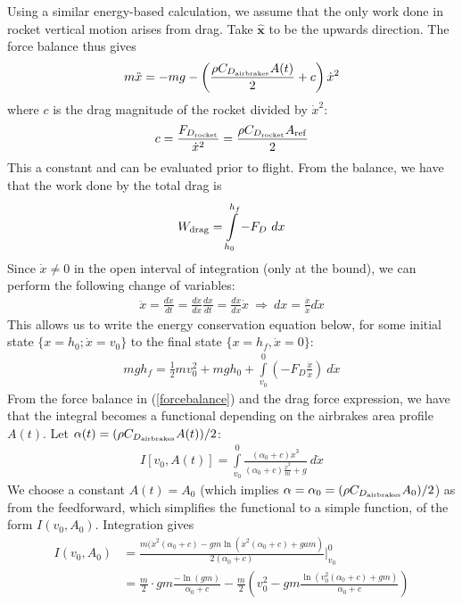 \documentclass{amsdtx}
\newcommand{\bs}[1]{\boldsymbol{#1}}
\begin{document}
Using a similar energy-based calculation, we assume that the only work done in rocket vertical motion arises from drag. Take $\bs{\hat x}$ to be the upwards direction. The force balance thus gives
\begin{align}
	m\ddot x = -mg - \left(\frac{\rho C_{D_{\rm airbrakes}}A(t)}{2}+c\right)\dot x^2\label{forcebalance}
\end{align}
where $c$ is the drag magnitude of the rocket divided by $\dot x^2$:
\begin{align}
	c = \frac{F_{D_{\rm rocket}}}{\dot x^2} = \frac{\rho C_{D_{\rm rocket}}A_{\rm ref}}{2}
\end{align}
This a constant and can be evaluated prior to flight.
From the balance, we have that the work done by the total drag is
\begin{align}
	W_{\rm drag} = \int \limits_{h_0}^{h_f}-F_D~dx
\end{align}
Since $\dot x\neq 0$ in the open interval of integration (only at the bound), we can perform the following change of variables:
\begin{align}
	\ddot x = \frac{d\dot x}{dt} = \frac{d\dot x}{dx}\frac{dx}{dt} = \frac{d\dot x}{dx}\dot x~\Rightarrow~dx = \frac{\dot x}{\ddot x}d\dot x
\end{align}
This allows us to write the energy conservation equation below, for some initial state $\{x=h_0;\dot x = v_0\}$ to the final state $\{x=h_f,\dot x = 0\}$:
\begin{align}
	mgh_f = \frac 12mv_0^2 + mgh_0 + \int\limits_{v_0}^0 \left(-F_D\frac{\dot x}{\ddot x}\right)~d\dot x
\end{align}
From the force balance in (\ref{forcebalance}) and the drag force expression, we have that the integral becomes a functional depending on the airbrakes area profile $A(t)$. Let $\alpha(t) = (\rho C_{D_{\rm airbrakes}}A(t))/2$:
\begin{align}
	I[v_0,A(t)] = \int\limits_{v_0}^0 \frac{(\alpha_0+c)\dot x^3}{\displaystyle(\alpha_0+c)\frac{\dot x^2}{m} + g}~d\dot x
\end{align}
We choose a constant $A(t) = A_0$ (which implies $\alpha=\alpha_0 = (\rho C_{D_{\rm airbrakes}}A_0)/2$) as from the feedforward, which simplifies the functional to a simple function, of the form $I(v_0,A_0)$. Integration gives
\begin{align}
	I(v_0,A_0) &= \frac{m(\dot x^2(\alpha_0+c) - gm\ln(\dot x^2(\alpha_0+c)+gam)}{2(\alpha_0+c)}\biggr|_{v_0}^0 \\
	&= \frac m2\cdot gm\frac{-\ln (gm)}{\alpha_0 + c} - \frac m2\left(v_0^2 - gm\frac{\ln(v_0^2(\alpha_0+c)+gm)}{\alpha_0+c}\right)
\end{align}
\end{document}
